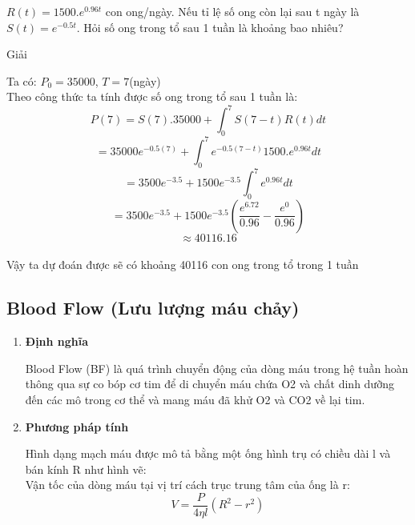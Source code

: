 \documentclass[12pt,a4paper]{article}
\begin{document}
\begin{enumerate}[a/]
\begin{flushleft}
            $R(t)=1500.e^{0.96t}$ con ong/ngày. 
            Nếu tỉ lệ số ong còn lại sau t ngày là $S(t) = e^{-0.5t}$. 
            Hỏi số ong trong tổ sau 1 tuần là khoảng bao nhiêu?
        \end{flushleft}
        \begin{center}
            Giải
        \end{center}
        \begin{flushleft}
            Ta có: $P_0=35000$, $T=7$(ngày)\\
            Theo công thức ta tính được số ong trong tổ sau 1 tuần là: %
            $$P(7)=S(7).35000 +\int_0^7S(7-t)R(t)dt$$
                $$=35000e^{-0.5(7)}+ \int_0^7e^{-0.5(7-t)}1500.e^{0.96t}dt$$
                $$=3500e^{-3.5}+1500e^{-3.5}\int_0^7e^{0.96t}dt$$
                $$=3500e^{-3.5}+1500e^{-3.5}(\frac{e^{6.72}}{0.96}-\frac{e^0}{0.96})$$
                $$\approx40116.16$$\\
                Vậy ta dự đoán được sẽ có khoảng 40116 con ong trong tổ trong 1 tuần
        \end{flushleft}  
        \newpage
    \subsection{Blood Flow (Lưu lượng máu chảy)}   
    \begin{enumerate} [a/]
        \item \textbf{Định nghĩa}
        \begin{flushleft}
        Blood Flow (BF) là quá trình chuyển động của dòng máu trong hệ tuần hoàn thông qua sự co bóp cơ tim để di chuyển máu chứa O2 và chất dinh dưỡng đến các mô trong cơ thể và mang máu đã khử O2 và CO2 về lại tim.          
        \end{flushleft}
        \item \textbf{Phương pháp tính }
        \begin{flushleft}
            Hình dạng mạch máu được mô tả bằng một ống hình trụ có chiều dài l và bán kính R như hình vẽ:\\
            Vận tốc của dòng máu tại vị trí cách trục trung tâm của ống là r: $$V=\frac{P}{4\eta l}(R^2-r^2)$$ \\


\end{flushleft}
\end{enumerate}
\end{enumerate}
\end{document}

